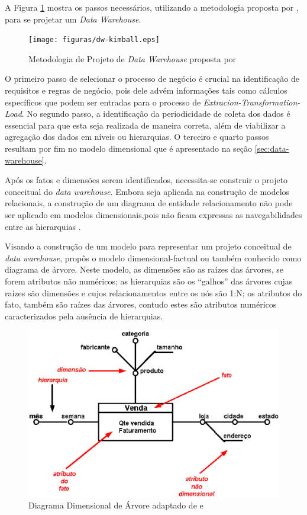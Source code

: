 A Figura \ref{fig:metodologia-dw} mostra os passos necessários, utilizando a metodologia proposta por , para se projetar um \textit{Data Warehouse}.

\begin{figure}[ht!]
\centering
\texttt{[image: figuras/dw-kimball.eps]}
\caption{Metodologia de Projeto de \textit{Data Warehouse} proposta por }
\label{fig:metodologia-dw}
\end{figure}
\FloatBarrier

O primeiro passo de selecionar o processo de negócio é crucial na identificação de requisitos e regras de negócio, pois dele advém informações tais como cálculos específicos que podem ser entradas para o processo de \textit{Extracion-Transformation-Load}. No segundo passo, a identificação da periodicidade de coleta dos dados é essencial para que esta seja realizada de maneira correta, além de viabilizar a agregação dos dados em níveis ou hierarquias. O terceiro e quarto passos resultam por fim no modelo dimensional que é apresentado na seção \ref{sec:data-warehouse}. 

Após os fatos e dimensões serem identificados, necessita-se construir o projeto conceitual do \textit{data warehouse}. Embora seja aplicada na construção de modelos relacionais, a construção de um diagrama de entidade relacionamento não pode ser aplicado em modelos dimensionais,pois não ficam expressas as navegabilidades entre as hierarquias \cite{Golfarelli1998}.

Visando a construção de um modelo para representar um projeto conceitual de \textit{data warehouse},  propôs o modelo dimensional-factual ou também conhecido como diagrama de árvore. Neste modelo, as dimensões são as raízes das árvores, se forem atributos não numéricos; as hierarquias são os “galhos” das árvores cujas raízes são dimensões e cujos relacionamentos entre os nós são 1:N; os atributos do fato, também são raízes das árvores, contudo estes são atributos numéricos caracterizados pela ausência de hierarquias.


\begin{figure}[ht!]
\centering
\includegraphics[keepaspectratio=true,scale=0.5]{figuras/arvore.eps}
\caption{Diagrama Dimensional de Árvore adaptado de  e }
\label{fig:tree}
\end{figure}
\FloatBarrier


